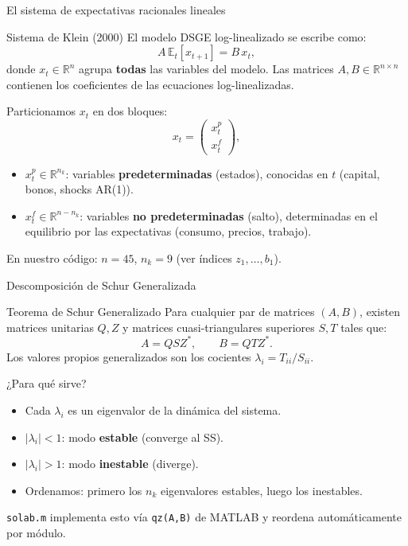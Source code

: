 \begin{frame}{El sistema de expectativas racionales lineales}

  \begin{bluebox}{Sistema de Klein (2000)}
    El modelo DSGE log-linealizado se escribe como:
    \[
      A\,\mathbb{E}_t[x_{t+1}] = B\,x_t,
    \]
    donde $x_t \in \mathbb{R}^n$ agrupa \textbf{todas} las variables del modelo.
    Las matrices $A, B \in \mathbb{R}^{n\times n}$ contienen los coeficientes
    de las ecuaciones log-linealizadas.
  \end{bluebox}

  \bigskip
  Particionamos $x_t$ en dos bloques:
  \[
    x_t = \begin{pmatrix} x^p_t \\ x^f_t \end{pmatrix},
  \]
  \begin{itemize}
    \item $x^p_t \in \mathbb{R}^{n_k}$: variables \textbf{predeterminadas} (estados),
          conocidas en $t$ (capital, bonos, shocks AR(1)).
    \item $x^f_t \in \mathbb{R}^{n-n_k}$: variables \textbf{no predeterminadas} (salto),
          determinadas en el equilibrio por las expectativas (consumo, precios, trabajo).
  \end{itemize}

  \bigskip
  En nuestro código: $n = 45$, $n_k = 9$ (ver índices $z_1,\ldots,b_1$).

\end{frame}


\begin{frame}{Descomposición de Schur Generalizada}

  \begin{greenbox}{Teorema de Schur Generalizado}
    Para cualquier par de matrices $(A, B)$, existen matrices unitarias $Q, Z$ y
    matrices cuasi-triangulares superiores $S, T$ tales que:
    \[
      A = Q S Z^*, \qquad B = Q T Z^*.
    \]
    Los valores propios generalizados son los cocientes $\lambda_i = T_{ii}/S_{ii}$.
  \end{greenbox}

  \bigskip
  \begin{block}{¿Para qué sirve?}
    \begin{itemize}
      \item Cada $\lambda_i$ es un eigenvalor de la dinámica del sistema.
      \item $|\lambda_i| < 1$: modo \textbf{estable} (converge al SS).
      \item $|\lambda_i| > 1$: modo \textbf{inestable} (diverge).
      \item Ordenamos: primero los $n_k$ eigenvalores estables, luego los inestables.
    \end{itemize}
  \end{block}

  \bigskip
  \small \texttt{solab.m} implementa esto vía \texttt{qz(A,B)} de MATLAB y reordena
  automáticamente por módulo.

\end{frame}

